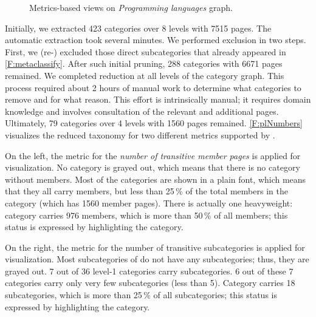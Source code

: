 \begin{figure}[t!]
\vspace{-42\in}

\caption{Metrics-based views on \emph{Programming languages} graph.}
\label{F:plNumbers}
\vspace{-42\in}
\end{figure}


Initially, we extracted 423 categories over 8 levels with 7515 pages. The automatic extraction took several minutes. We performed exclusion in two steps. First, we (re-) excluded those direct subcategories that already appeared in \autoref{F:metaclassify}. After such initial pruning, 288 categories with 6671 pages remained. We completed reduction at all levels of the category graph. This process required about 2 hours of manual work to determine what categories to remove and for what reason. This effort is intrinsically manual; it requires domain knowledge and involves consultation of the relevant and additional \Wikipedia{} pages. Ultimately, 79 categories over 4 levels with 1560 pages remained.  \autoref{F:plNumbers} visualizes the reduced taxonomy for two different metrics supported by \WikiTax.

On the left, the metric for the \emph{number of transitive member pages} is applied for visualization. No category is grayed out, which means that there is no category without members. Most of the categories are shown in a plain font, which means that they all carry members, but less than 25\,\% of the total members in the category  (which has 1560 member pages). There is actually one heavyweight: category  carries 976 members, which is more than 50\,\% of all members; this status is expressed by 
highlighting the category.

On the right, the metric for the number of transitive subcategories is applied for visualization. Most subcategories of  do not have any subcategories; thus, they are grayed out. 7 out of 36 level-1 categories carry subcategories. 6 out of these 7 categories carry only very few subcategories (less than 5). Category  carries 18 subcategories, which is more than 25\,\% of all subcategories; this status is expressed by highlighting the category.

